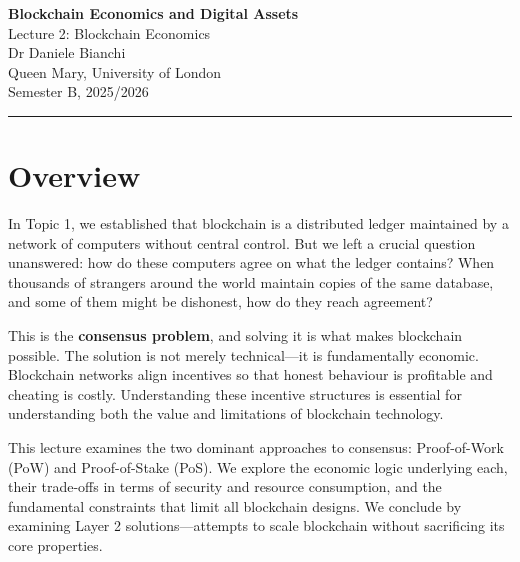 \documentclass[11pt,a4paper]{article}
\newcommand{\keyword}[1]{\textbf{\textcolor{AccentOrange}{#1}}}
\begin{document}
\begin{center}
    {\LARGE\bfseries\textcolor{ImperialBlue}{Blockchain Economics and Digital Assets}}\\[0.5em]
    {\Large Lecture 2: Blockchain Economics}\\[1em]
    {\large Dr Daniele Bianchi}\\[0.5em]
    {\normalsize Queen Mary, University of London}\\[0.3em]
    {\normalsize Semester B, 2025/2026}
\end{center}

\vspace{1em}
\hrule
\vspace{1em}

\tableofcontents

\vspace{2cm}

\section*{Overview}

In Topic 1, we established that blockchain is a distributed ledger maintained by a network of computers without central control. But we left a crucial question unanswered: how do these computers agree on what the ledger contains? When thousands of strangers around the world maintain copies of the same database, and some of them might be dishonest, how do they reach agreement?

This is the \keyword{consensus problem}, and solving it is what makes blockchain possible. The solution is not merely technical---it is fundamentally economic. Blockchain networks align incentives so that honest behaviour is profitable and cheating is costly. Understanding these incentive structures is essential for understanding both the value and limitations of blockchain technology.

This lecture examines the two dominant approaches to consensus: Proof-of-Work (PoW) and Proof-of-Stake (PoS). We explore the economic logic underlying each, their trade-offs in terms of security and resource consumption, and the fundamental constraints that limit all blockchain designs. We conclude by examining Layer 2 solutions---attempts to scale blockchain without sacrificing its core properties.
\end{document}
